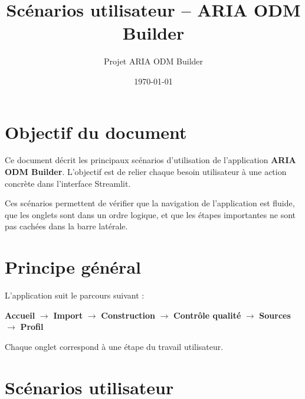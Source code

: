 \documentclass[11pt,a4paper]{article}
\title{\textbf{Scénarios utilisateur -- ARIA ODM Builder}}
\author{Projet ARIA ODM Builder}
\date{\today}
\begin{document}
\maketitle

\section{Objectif du document}

Ce document décrit les principaux scénarios d'utilisation de l'application
\textbf{ARIA ODM Builder}.  
L'objectif est de relier chaque besoin utilisateur à une action concrète dans
l'interface Streamlit.

Ces scénarios permettent de vérifier que la navigation de l'application est
fluide, que les onglets sont dans un ordre logique, et que les étapes importantes
ne sont pas cachées dans la barre latérale.

\section{Principe général}

L'application suit le parcours suivant :

\begin{center}
\textbf{Accueil} $\rightarrow$
\textbf{Import} $\rightarrow$
\textbf{Construction} $\rightarrow$
\textbf{Contrôle qualité} $\rightarrow$
\textbf{Sources} $\rightarrow$
\textbf{Profil}
\end{center}

Chaque onglet correspond à une étape du travail utilisateur.

\section{Scénarios utilisateur}

\renewcommand{\arraystretch}{1.35}
\end{document}
